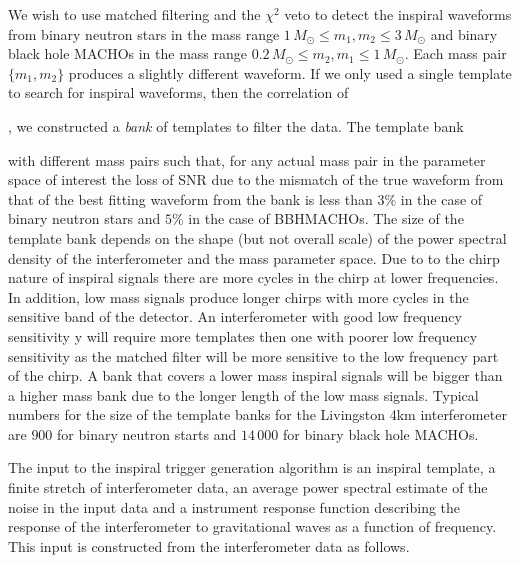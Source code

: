 We wish to use matched filtering and the $\chi^2$ veto to detect the inspiral
waveforms from binary neutron stars in the mass range $1\,M_\odot\le m_1,
m_2\le 3\,M_\odot$ and binary black hole MACHOs in the mass range
$0.2\,M_\odot\le m_2, m_1\le 1\,M_\odot$. Each mass pair $\{m_1,m_2\}$
produces a slightly different waveform. If we only used a single template to
search for inspiral waveforms, then the correlation of 


, we constructed a {\em bank} of
templates to filter the data. The template bank 


with different mass pairs such that, for any actual mass pair in the
parameter space of interest the loss of SNR due to the mismatch of the true
waveform from that of the best fitting waveform from the bank is less than
$3\%$ in the case of binary neutron stars and $5\%$ in the case of
BBHMACHOs\cite{owensatyha}.  The size of the template bank depends on the
shape (but not overall scale) of the power spectral density of the
interferometer and the mass parameter space. Due to to the chirp nature of
inspiral signals there are more cycles in the chirp at lower frequencies. In
addition, low mass signals produce longer chirps with more cycles in the
sensitive band of the detector. An interferometer with good low frequency
sensitivity y will require more templates then one with poorer low frequency
sensitivity as the matched filter will be more sensitive to the low frequency
part of the chirp. A bank that covers a lower mass inspiral signals will be
bigger than a higher mass bank due to the longer length of the low mass signals. 
Typical numbers for the size of the template banks for the Livingston 4km
interferometer are $900$ for binary neutron starts and $14\,000$ for binary
black hole MACHOs.

The input to the inspiral trigger generation algorithm is an inspiral
template, a finite stretch of interferometer data, an average power spectral
estimate of the noise in the input data and a instrument response function
describing the response of the interferometer to gravitational waves as a
function of frequency. This input is constructed from the interferometer data
as follows.  

